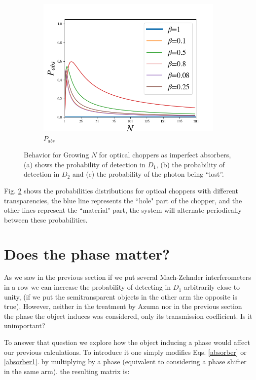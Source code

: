 \documentclass{book}
\begin{document}
\begin{figure}[!t]
\begin{subfigure}[b]{0.45\linewidth}
\includegraphics[width=\linewidth]{images/Chopper_abs.png}
\caption{$P_{abs}$}
\label{fig:BS1}
\end{subfigure}
\caption{Behavior for Growing $N$ for optical choppers as imperfect absorbers, (a) shows the probability of detection in $D_{1}$, (b) the probability of detection in $D_{2}$ and (c) the probability of the photon being ``lost''.}
\label{fig:several_chpper}
\end{figure}
 

Fig. \ref{fig:several_chpper} shows the probabilities distributions for optical choppers with different transparencies, the blue line represents the ``hole" part of the chopper, and the other lines represent the ``material" part, the system will alternate periodically between these probabilities.

\section{Does the phase matter?}

As we saw in the previous section if we put several Mach-Zehnder interferometers in a row we can increase the probability of detecting in $D_{1}$ arbitrarily close to unity, (if we put the semitransparent objects in the other arm the opposite is true). However, neither in the treatment by Azuma \cite{Azuma} nor in the previous section the phase the object induces was considered, only its transmission coefficient. Is it unimportant?

To answer that question we explore how the object inducing a phase would affect our previous calculations. To introduce it one simply modifies Eqs. \ref{absorber} or \ref{absorber1}. by multiplying by a phase (equivalent to considering a phase shifter in the same arm). the resulting matrix is:
\end{document}

